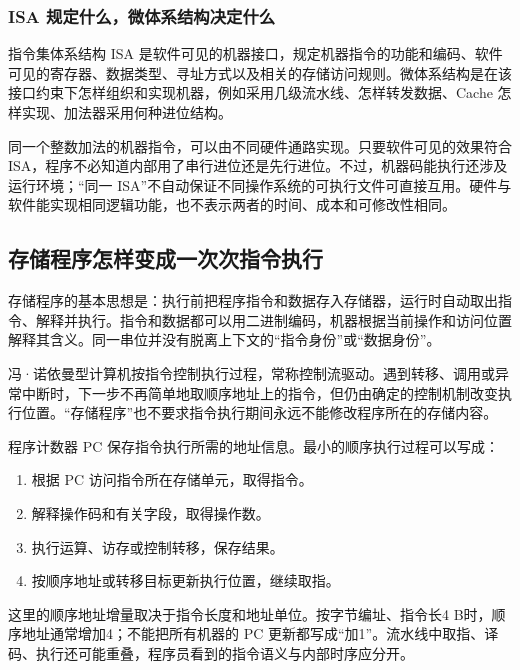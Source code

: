 \subsubsection{ISA 规定什么，微体系结构决定什么}\label{isa-ux89c4ux5b9aux4ec0ux4e48ux5faeux4f53ux7cfbux7ed3ux6784ux51b3ux5b9aux4ec0ux4e48}

指令集体系结构 ISA 是软件可见的机器接口，规定机器指令的功能和编码、软件可见的寄存器、数据类型、寻址方式以及相关的存储访问规则。微体系结构是在该接口约束下怎样组织和实现机器，例如采用几级流水线、怎样转发数据、Cache 怎样实现、加法器采用何种进位结构。

同一个整数加法的机器指令，可以由不同硬件通路实现。只要软件可见的效果符合 ISA，程序不必知道内部用了串行进位还是先行进位。不过，机器码能执行还涉及运行环境；``同一 ISA''不自动保证不同操作系统的可执行文件可直接互用。硬件与软件能实现相同逻辑功能，也不表示两者的时间、成本和可修改性相同。

\subsection{存储程序怎样变成一次次指令执行}\label{co-01-02}

存储程序的基本思想是：执行前把程序指令和数据存入存储器，运行时自动取出指令、解释并执行。指令和数据都可以用二进制编码，机器根据当前操作和访问位置解释其含义。同一串位并没有脱离上下文的``指令身份''或``数据身份''。

冯·诺依曼型计算机按指令控制执行过程，常称控制流驱动。遇到转移、调用或异常中断时，下一步不再简单地取顺序地址上的指令，但仍由确定的控制机制改变执行位置。``存储程序''也不要求指令执行期间永远不能修改程序所在的存储内容。

程序计数器 PC 保存指令执行所需的地址信息。最小的顺序执行过程可以写成：

\begin{enumerate}
\def\labelenumi{\arabic{enumi}.}
\tightlist
\item
  根据 PC 访问指令所在存储单元，取得指令。
\item
  解释操作码和有关字段，取得操作数。
\item
  执行运算、访存或控制转移，保存结果。
\item
  按顺序地址或转移目标更新执行位置，继续取指。
\end{enumerate}

这里的顺序地址增量取决于指令长度和地址单位。按字节编址、指令长4 B时，顺序地址通常增加4；不能把所有机器的 PC 更新都写成``加1''。流水线中取指、译码、执行还可能重叠，程序员看到的指令语义与内部时序应分开。

